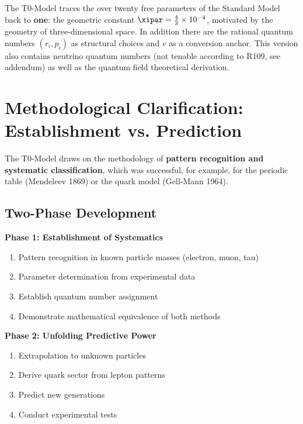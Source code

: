 	\begin{important}
		The T0-Model traces the over twenty free parameters of the Standard Model back to \textbf{one}: the geometric constant $\xipar = \frac{4}{3} \times 10^{-4}$, motivated by the geometry of three-dimensional space. In addition there are the rational quantum numbers $(r_i, p_i)$ as structural choices and $v$ as a conversion anchor. This version also contains neutrino quantum numbers (not tenable according to R109, see addendum) as well as the quantum field theoretical derivation.
	\end{important}
	
	\section{Methodological Clarification: Establishment vs. Prediction}
	\label{sec:methodological_clarification}
	
	\begin{important}
		The T0-Model draws on the methodology of \textbf{pattern recognition and systematic classification}, which was successful, for example, for the periodic table (Mendeleev 1869) or the quark model (Gell-Mann 1964).
	\end{important}
	
	\subsection{Two-Phase Development}
	\label{subsec:two_phases}
	
	\textbf{Phase 1: Establishment of Systematics}
	\begin{enumerate}
		\item Pattern recognition in known particle masses (electron, muon, tau)
		\item Parameter determination from experimental data
		\item Establish quantum number assignment
		\item Demonstrate mathematical equivalence of both methods
	\end{enumerate}
	
	\textbf{Phase 2: Unfolding Predictive Power}
	\begin{enumerate}
		\item Extrapolation to unknown particles
		\item Derive quark sector from lepton patterns
		\item Predict new generations
		\item Conduct experimental tests
	\end{enumerate}
	
